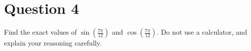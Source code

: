 \chapter{Question 4}
Find the exact values of $\sin(\frac{7\pi}{12})$ and $\cos(\frac{7\pi}{12})$.
Do not use a calculator, and explain your reasoning carefully.
